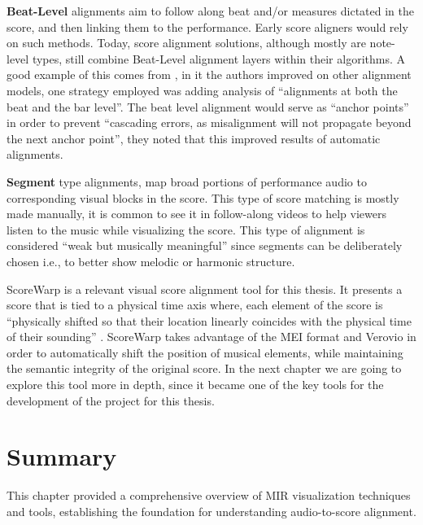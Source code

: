  \textbf{Beat-Level} alignments aim to follow along beat and/or measures dictated in the score, and then linking them to the performance. Early score aligners \cite{duanSoundprismOnlineSystem2011} would rely on such methods. Today, score alignment solutions, although mostly are note-level types, still combine Beat-Level alignment layers within their algorithms. A good example of this comes from \cite{peterAutomaticNoteLevelScoretoPerformance2023}, in it the authors improved on other alignment models, one strategy employed was adding analysis of ``alignments at both the beat and the bar level''. The beat level alignment would serve as ``anchor points'' in order to prevent ``cascading errors, as misalignment will not propagate beyond the next anchor point'', they noted that this improved results of automatic alignments.

\textbf{Segment} type alignments, map broad portions of performance audio to corresponding visual blocks in the score. This type of score matching is mostly made manually, it is common to see it in follow-along videos to help viewers listen to the music while visualizing the score. This type of alignment is considered ``weak but musically meaningful'' \cite{jungUnifiedCrossmodalTranslation2026a} since segments can be deliberately chosen i.e., to better show melodic or harmonic structure.


ScoreWarp is a relevant visual score alignment tool for this thesis. It presents a score that is tied to a physical time axis where, each element of the score is ``physically shifted so that their location linearly coincides with the physical time of their sounding'' \cite{goeblLetsScoreWarpAgain2025a}. ScoreWarp takes advantage of the MEI format and Verovio in order to automatically shift the position of musical elements, while maintaining the semantic integrity of the original score. In the next chapter we are going to explore this tool more in depth, since it became one of the key tools for the development of the project for this thesis. 

\section{Summary}\label{sec:summary}
This chapter provided a comprehensive overview of \ac{MIR} visualization techniques and tools, establishing the foundation for understanding audio-to-score alignment. 

